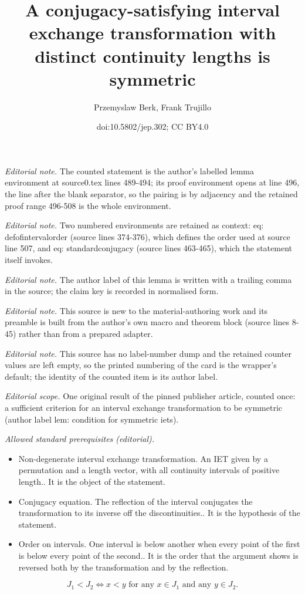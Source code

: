 \documentclass[10pt,a4paper]{article}
\title{A conjugacy-satisfying interval exchange transformation with distinct continuity lengths is symmetric}
\author{Przemyslaw Berk, Frank Trujillo}
\date{doi:10.5802/jep.302; CC BY4.0}
\theoremstyle{plain}
\theoremstyle{definition}
\begin{document}
\maketitle
\noindent\textit{Editorial note.} The counted statement is the author's labelled lemma environment at source0.tex lines 489-494; its proof environment opens at line 496, the line after the blank separator, so the pairing is by adjacency and the retained proof range 496-508 is the whole environment.\par\medskip
\noindent\textit{Editorial note.} Two numbered environments are retained as context: eq: defofintervalorder (source lines 374-376), which defines the order used at source line 507, and eq: standardconjugacy (source lines 463-465), which the statement itself invokes.\par\medskip
\noindent\textit{Editorial note.} The author label of this lemma is written with a trailing comma in the source; the claim key is recorded in normalised form.\par\medskip
\noindent\textit{Editorial note.} This source is new to the material-authoring work and its preamble is built from the author's own macro and theorem block (source lines 8-45) rather than from a prepared adapter.\par\medskip
\noindent\textit{Editorial note.} This source has no label-number dump and the retained counter values are left empty, so the printed numbering of the card is the wrapper's default; the identity of the counted item is its author label.\par\medskip
\noindent\textit{Editorial scope.} One original result of the pinned publisher article, counted once: a sufficient criterion for an interval exchange transformation to be symmetric (author label lem: condition for symmetric iets).\par\medskip
\noindent\textit{Allowed standard prerequisites (editorial).}\begin{itemize}
\item Non-degenerate interval exchange transformation. An IET given by a permutation and a length vector, with all continuity intervals of positive length.. It is the object of the statement.
\item Conjugacy equation. The reflection of the interval conjugates the transformation to its inverse off the discontinuities.. It is the hypothesis of the statement.
\item Order on intervals. One interval is below another when every point of the first is below every point of the second.. It is the order that the argument shows is reversed both by the transformation and by the reflection.
\end{itemize}\medskip
\begin{equation}\label{eq: defofintervalorder}
J_1<J_2\iff x<y \text{ for any }x\in J_1\text{ and any }y\in J_2.
\end{equation}
\end{document}
